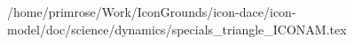 /home/primrose/Work/IconGrounds/icon-dace/icon-model/doc/science/dynamics/specials_triangle_ICONAM.tex